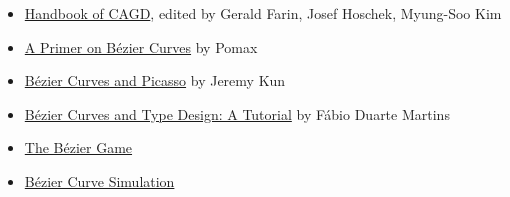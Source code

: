 \documentclass{article}
\begin{document}
\begin{itemize}
\itemsep1pt\parskip0pt
\item
  \href{http://www.sciencedirect.com/science/book/9780444511041}{Handbook
  of CAGD}, edited by Gerald Farin, Josef Hoschek, Myung-Soo Kim
\item
  \href{http://pomax.github.io/bezierinfo/}{A Primer on Bézier Curves}
  by Pomax
\item
  \href{http://jeremykun.com/2013/05/11/bezier-curves-and-picasso/}{Bézier
  Curves and Picasso} by Jeremy Kun
\item
  \href{http://learn.scannerlicker.net/2014/04/16/bezier-curves-and-type-design-a-tutorial/}{Bézier
  Curves and Type Design: A Tutorial} by Fábio Duarte Martins
\item
  \href{http://bezier.method.ac/}{The Bézier Game}
\item
  \href{http://tholman.com/bezier-curve-simulation/}{Bézier Curve
  Simulation}
\end{itemize}
\end{document}
